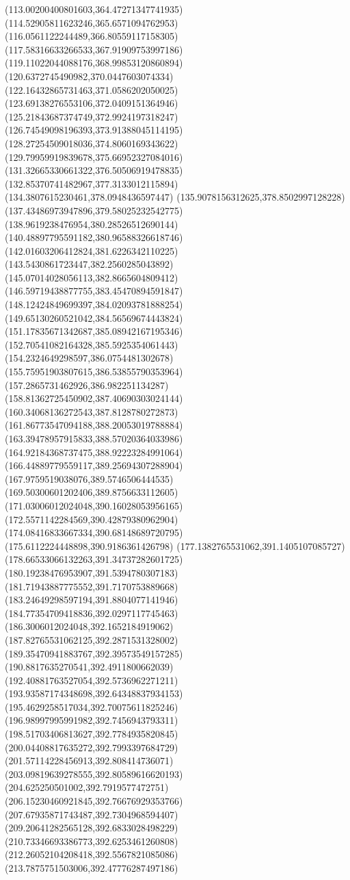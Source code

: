 {(113.00200400801603,364.47271347741935)
(114.52905811623246,365.6571094762953)
(116.0561122244489,366.80559117158305)
(117.58316633266533,367.91909753997186)
(119.11022044088176,368.99853120860894)
(120.6372745490982,370.0447603074334)
(122.16432865731463,371.0586202050025)
(123.69138276553106,372.0409151364946)
(125.21843687374749,372.9924197318247)
(126.74549098196393,373.91388045114195)
(128.27254509018036,374.8060169343622)
(129.79959919839678,375.66952327084016)
(131.32665330661322,376.50506919478835)
(132.85370741482967,377.3133012115894)
(134.3807615230461,378.0948436597447)
(135.9078156312625,378.8502997128228)
(137.43486973947896,379.58025232542775)
(138.9619238476954,380.28526512690144)
(140.48897795591182,380.96588326618746)
(142.01603206412824,381.6226342110225)
(143.5430861723447,382.2560285043892)
(145.07014028056113,382.8665604809412)
(146.59719438877755,383.45470894591847)
(148.12424849699397,384.02093781888254)
(149.65130260521042,384.56569674443824)
(151.17835671342687,385.08942167195346)
(152.70541082164328,385.5925354061443)
(154.2324649298597,386.0754481302678)
(155.75951903807615,386.53855790353964)
(157.2865731462926,386.982251134287)
(158.81362725450902,387.40690303024144)
(160.34068136272543,387.8128780272873)
(161.86773547094188,388.20053019788884)
(163.39478957915833,388.57020364033986)
(164.92184368737475,388.92223284991064)
(166.44889779559117,389.25694307288904)
(167.9759519038076,389.5746506444535)
(169.50300601202406,389.8756633112605)
(171.03006012024048,390.16028053956165)
(172.5571142284569,390.42879380962904)
(174.08416833667334,390.68148689720795)
(175.6112224448898,390.9186361426798)
(177.1382765531062,391.1405107085727)
(178.66533066132263,391.34737282601725)
(180.19238476953907,391.5394780307183)
(181.71943887775552,391.7170753889668)
(183.24649298597194,391.8804077141946)
(184.77354709418836,392.0297117745463)
(186.3006012024048,392.1652184919062)
(187.82765531062125,392.2871531328002)
(189.35470941883767,392.39573549157285)
(190.8817635270541,392.4911800662039)
(192.40881763527054,392.5736962271211)
(193.93587174348698,392.64348837934153)
(195.4629258517034,392.70075611825246)
(196.98997995991982,392.7456943793311)
(198.51703406813627,392.7784935820845)
(200.04408817635272,392.7993397684729)
(201.57114228456913,392.808414736071)
(203.09819639278555,392.80589616620193)
(204.625250501002,392.7919577472751)
(206.15230460921845,392.76676929353766)
(207.67935871743487,392.7304968594407)
(209.20641282565128,392.6833028498229)
(210.73346693386773,392.6253461260808)
(212.26052104208418,392.5567821085086)
(213.7875751503006,392.47776287497186)
}
